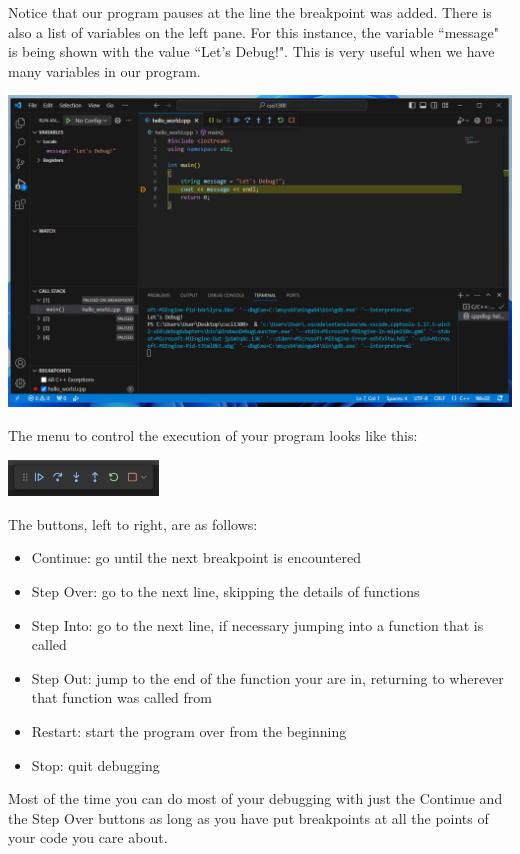 Notice that our program pauses at the line the breakpoint was added. There is also a list of variables on the left pane. For this instance, the variable ``message" is being shown with the value ``Let's Debug!". This is very useful when we have many variables in our program. 

\includegraphics[width=\textwidth]{images/windowsDebuggerSetup/debugger_windows_16.png}

The menu to control the execution of your program looks like this:

\includegraphics[width=0.3\textwidth]{images/windowsDebuggerSetup/debugger_windows_17.png}

The buttons, left to right, are as follows:

\begin{itemize}
    \item Continue: go until the next breakpoint is encountered
    \item Step Over: go to the next line, skipping the details of functions
    \item Step Into: go to the next line, if necessary jumping into a function that is called
    \item Step Out: jump to the end of the function your are in, returning to wherever that function was called from
    \item Restart: start the program over from the beginning
    \item Stop: quit debugging
\end{itemize}

Most of the time you can do most of your debugging with just the Continue and the Step Over buttons as long as you have put breakpoints at all the points of your code you care about.

